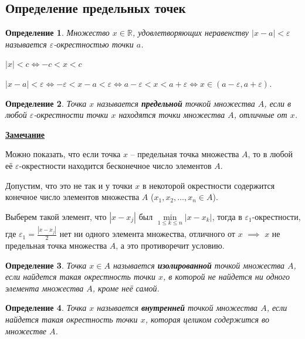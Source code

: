\documentclass[a4paper,oneside]{article}
\newtheorem{definition}{Определение}[subsection]
\begin{document}
\subsection{Определение предельных точек}

\begin{definition}
    Множество $x \in \mathbb{R}$, удовлетворяющих неравенству $|x - a| < \varepsilon$
    называется $\varepsilon$-окрестностью точки $a$.
    
    $|x| < c \Leftrightarrow -c < x < c$
    
    $|x - a| < \varepsilon \Leftrightarrow -\varepsilon < x - a < \varepsilon \Leftrightarrow
    a - \varepsilon < x < a + \varepsilon \Leftrightarrow x \in (a - \varepsilon, a + \varepsilon)$.    
\end{definition}

\begin{definition}
    Точка $x$ называется \textbf{предельной} точкой множества $A$, если в любой $\varepsilon$-окрестности
    точки $x$ находятся точки множества $A$, отличные от $x$.        
\end{definition}

\underline{\textbf{Замечание}}

Можно показать, что если точка $x$ -- предельная точка множества $A$, то в любой её
$\varepsilon$-окрестности находится бесконечное число элементов $A$.

Допустим, что это не так и у точки $x$ в некоторой окрестности содержится конечное
число элементов множества $A$ ($x_1,x_2,\dots,x_n \in A$).

Выберем такой элемент, что $|x - x_j|$ был $\underset{1 \le k \le n}{\min} |x - x_k|$,
тогда в $\varepsilon_1$-окрестности, где $\varepsilon_1 = \frac{|x - x_j|}{2}$ нет ни
одного элемента множества, отличного от $x$ $\implies$ $x$ не предельная точка множества
$A$, а это противоречит условию.


\begin{definition}
    Точка $x \in A$ называется \textbf{изолированной} точкой множества $A$, если найдется такая
    окрестность точки $x$, в которой не найдется ни одного элемента множества $A$,
    кроме неё самой.        
\end{definition}

\begin{definition}
    Точка $x$ называется \textbf{внутренней} точкой множества $A$, если найдется такая
    окрестность точки $x$, которая целиком содержится во множестве $A$.
\end{definition}
\end{document}
